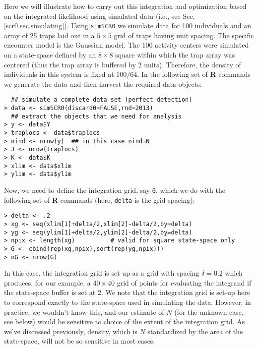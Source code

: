Here we will illustrate how to carry out this integration and
optimization based on the integrated likelihood using simulated data
 (i.e., see Sec. \ref{scr0.sec.simulating}). Using \mbox{\tt simSCR0}
 we simulate data for 100 individuals and an array of 25 traps
laid out in a $5 \times 5$ grid of traps having unit spacing.  The specific encounter
model is the Gaussian model. The 100 activity centers were
simulated on a state-space defined by an $8 \times 8$ square 
within which the
trap array was centered (thus the trap array is buffered by 2
units). Therefore, the density of individuals in this system is fixed
at $100/64$.
In the following set of {\bf R} commands we generate the data and 
then harvest the required data objects:
{\small
\begin{verbatim}
  ## simulate a complete data set (perfect detection)
> data <- simSCR0(discard0=FALSE,rnd=2013)
  ## extract the objects that we need for analysis
> y <- data$Y
> traplocs <- data$traplocs
> nind <- nrow(y)  ## in this case nind=N
> J <- nrow(traplocs)
> K <- data$K
> xlim <- data$xlim
> ylim <- data$ylim
\end{verbatim}
}
{\flushleft Now,} we need to define the integration grid, say
\mbox{\tt G}, which we do with
the following set of {\bf R} commands (here, \mbox{\tt delta} is the grid spacing):
{\small
\begin{verbatim}
> delta <- .2
> xg <- seq(xlim[1]+delta/2,xlim[2]-delta/2,by=delta) 
> yg <- seq(ylim[1]+delta/2,ylim[2]-delta/2,by=delta) 
> npix <- length(xg)          # valid for square state-space only
> G <- cbind(rep(xg,npix),sort(rep(yg,npix)))
> nG <- nrow(G)
\end{verbatim}
}
{\flushleft In this case}, the integration grid is set up as a grid with spacing
$\delta = 0.2$ which produces, for our example, a $40 \times 40$ grid of points for evaluating the
integrand if the state-space buffer is set at 2. We note that the
integration grid is set-up here to correspond exactly to the
state-space used in simulating the data. However, in practice, we
wouldn't know this, and our estimate of $N$ (for the unknown case, see
below) would be sensitive to choice of the extent of the integration
grid. As we've discussed previously, density, which is $N$
standardized by the area of the state-space, will not be so sensitive
in most cases. 

